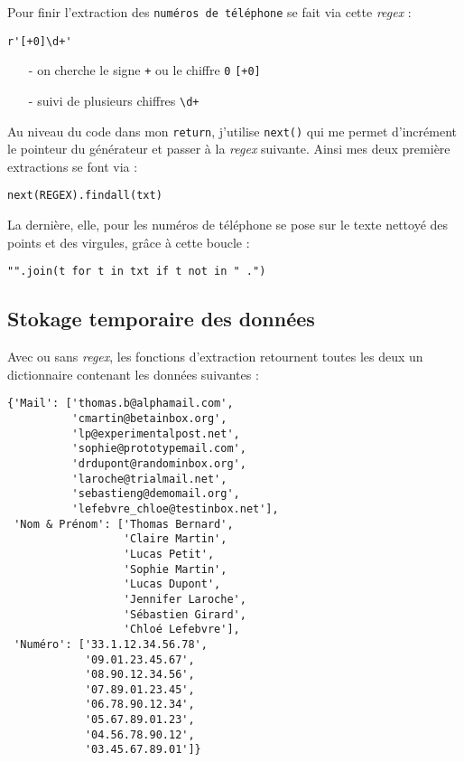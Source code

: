 \documentclass[a4paper,12pt]{article}
\begin{document}
Pour finir l'extraction des \texttt{numéros de téléphone} se fait via cette \textit{regex} :
\begin{verbatim}
r'[+0]\d+'
\end{verbatim}
\begin{itemize}
	\item[-] on cherche le signe \og \texttt{+}\fg{} ou le chiffre \og \texttt{0}\fg{} \texttt{[+0]}
	\item[-] suivi de plusieurs chiffres \texttt{\textbackslash{}d+}
\end{itemize}
\medskip

Au niveau du code dans mon \texttt{return}, j'utilise \texttt{next()} qui me permet d'incrément le pointeur du générateur et passer à la \textit{regex} suivante. Ainsi mes deux première extractions se font via :
\begin{verbatim}
next(REGEX).findall(txt)
\end{verbatim}
\medskip

La dernière, elle, pour les numéros de téléphone se pose sur le texte nettoyé des points et des virgules, grâce à cette boucle :
\begin{verbatim}
"".join(t for t in txt if t not in " .")
\end{verbatim}
\medskip

\subsection*{Stokage temporaire des données}
Avec ou sans \textit{regex}, les fonctions d'extraction retournent toutes les deux un dictionnaire contenant les données suivantes :
\begin{verbatim}
{'Mail': ['thomas.b@alphamail.com',
          'cmartin@betainbox.org',
          'lp@experimentalpost.net',
          'sophie@prototypemail.com',
          'drdupont@randominbox.org',
          'laroche@trialmail.net',
          'sebastieng@demomail.org',
          'lefebvre_chloe@testinbox.net'],
 'Nom & Prénom': ['Thomas Bernard',
                  'Claire Martin',
                  'Lucas Petit',
                  'Sophie Martin',
                  'Lucas Dupont',
                  'Jennifer Laroche',
                  'Sébastien Girard',
                  'Chloé Lefebvre'],
 'Numéro': ['33.1.12.34.56.78',
            '09.01.23.45.67',
            '08.90.12.34.56',
            '07.89.01.23.45',
            '06.78.90.12.34',
            '05.67.89.01.23',
            '04.56.78.90.12',
            '03.45.67.89.01']}
\end{verbatim}
\medskip
\end{document}
